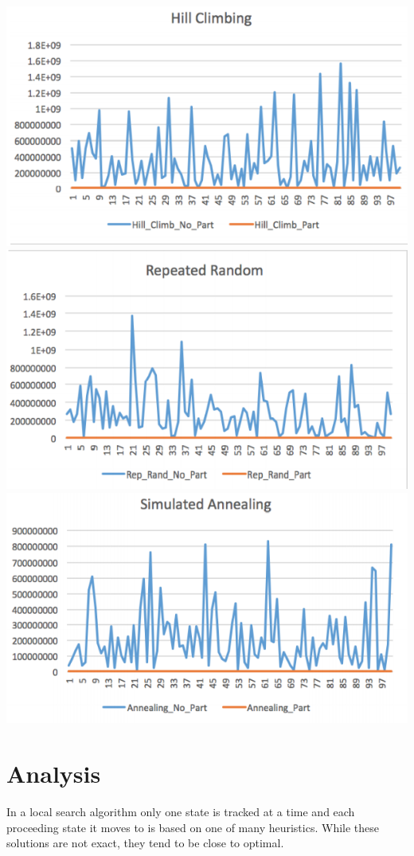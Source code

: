 \documentclass[11pt]{article}
\begin{document}
\includegraphics{hillclimbing}\\
\includegraphics{reprandom}\\
\includegraphics{simann}\\

\section{\textbf{Analysis}}
In a local search algorithm only one state is tracked at a time and each proceeding state it moves to is based on one of many heuristics. While these solutions are not exact, they tend to be close to optimal. \\
\end{document}
